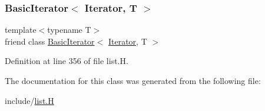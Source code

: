 \subsubsection{\texorpdfstring{Basic\+Iterator$<$ Iterator, T $>$}{BasicIterator< Iterator, T >}}
{\footnotesize\ttfamily template$<$typename T$>$ \\
friend class \hyperlink{class_designar_1_1_basic_iterator}{Basic\+Iterator}$<$ \hyperlink{class_designar_1_1_s_l_list_1_1_iterator}{Iterator}, T $>$\hspace{0.3cm}{\ttfamily [friend]}}



Definition at line 356 of file list.\+H.



The documentation for this class was generated from the following file\+:\begin{DoxyCompactItemize}
\item 
include/\hyperlink{list_8_h}{list.\+H}\end{DoxyCompactItemize}
